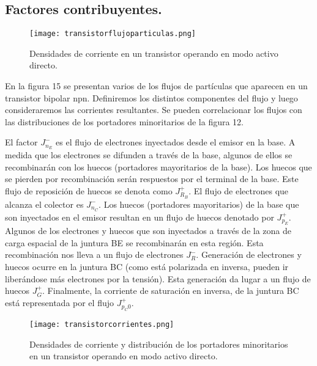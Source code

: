 \documentclass[12pt,a4paper]{article}
\begin{document}
\subsection{Factores contribuyentes.}

\begin{figure}[ht!]
\begin{center}
\texttt{[image: transistorflujoparticulas.png]}
\caption{Densidades de corriente en un transistor operando en modo activo directo.}
\end{center}
\end{figure}

En la figura 15 se presentan varios de los flujos de partículas que aparecen en un transistor bipolar npn. Definiremos los distintos componentes del flujo y luego consideraremos las corrientes resultantes. Se pueden correlacionar los flujos con las distribuciones de los portadores minoritarios de la figura 12.

El factor $J^{-}_{n_{E}}$ es el flujo de electrones inyectados desde el emisor en la base. A medida que los electrones se difunden a través de la base, algunos de ellos se recombinarán con los huecos (portadores mayoritarios de la base). Los huecos que se pierden por recombinación serán respuestos por el terminal de la base. Este flujo de reposición de huecos se denota como $J^{+}_{R_{B}}$. El flujo de electrones que alcanza el colector es $J^{-}_{n_{C}}$. Los huecos (portadores mayoritarios) de la base que son inyectados en el emisor resultan en un flujo de huecos denotado por $J^{+}_{p_{E}}$. Algunos de los electrones y huecos que son inyectados a través de la zona de carga espacial de la juntura BE se recombinarán en esta región. Esta recombinación nos lleva a un flujo de electrones $J^{-}_{R}$. Generación de electrones y huecos ocurre en la juntura BC (como está polarizada en inversa, pueden ir liberándose más electrones por la tensión). Esta generación da lugar a un flujo de huecos $J_{G}^{+}$. Finalmente, la corriente de saturación en inversa, de la juntura BC está representada por el flujo $J^{+}_{p_{C}0}$.

\begin{figure}[ht!]
\begin{center}
\texttt{[image: transistorcorrientes.png]}
\caption{Densidades de corriente y distribución de los portadores minoritarios en un transistor operando en modo activo directo.}
\end{center}
\end{figure}
\end{document}

